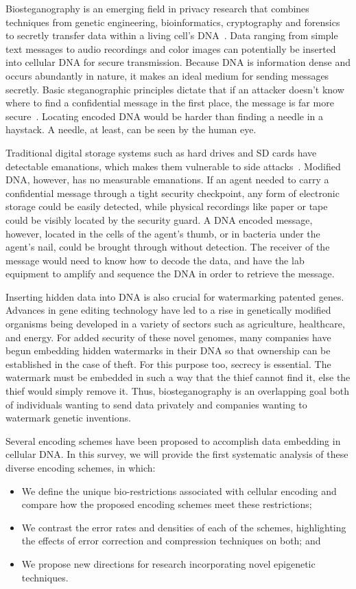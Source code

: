 \documentclass{bioinfo}
\begin{document}
Biosteganography is an emerging field in privacy research that combines techniques from genetic engineering, bioinformatics, cryptography and forensics to secretly transfer data within a living cell's DNA~\cite{B2016JOB}. Data ranging from simple text messages to audio recordings and color images can potentially be inserted into cellular DNA for secure transmission. Because DNA is information dense and occurs abundantly in nature, it makes an ideal medium for sending messages secretly. Basic steganographic principles dictate that if an attacker doesn't know where to find a confidential message in the first place, the message is far more secure~\cite{A2001IEEEIC}. Locating encoded DNA would be harder than finding a needle in a haystack. A needle, at least, can be seen by the human eye.

Traditional digital storage systems such as hard drives and SD cards have detectable emanations, which makes them vulnerable to side attacks~\cite{T2008TOIAS}. Modified DNA, however, has no measurable emanations. If an agent needed to carry a confidential message through a tight security checkpoint, any form of electronic storage could be easily detected, while physical recordings like paper or tape could be visibly located by the security guard. A DNA encoded message, however, located in the cells of the agent's thumb, or in bacteria under the agent's nail, could be brought through without detection. The receiver of the message would need to know how to decode the data, and have the lab equipment to amplify and sequence the DNA in order to retrieve the message.

Inserting hidden data into DNA is also crucial for watermarking patented genes. Advances in gene editing technology have led to a rise in genetically modified organisms being developed in a variety of sectors such as agriculture, healthcare, and energy. For added security of these novel genomes, many companies have begun embedding hidden watermarks in their DNA so that ownership can be established in the case of theft. For this purpose too, secrecy is essential. The watermark must be embedded in such a way that the thief cannot find it, else the thief would simply remove it. Thus, biosteganography is an overlapping goal both of individuals wanting to send data privately and companies wanting to watermark genetic inventions.

Several encoding schemes have been proposed to accomplish data embedding in cellular DNA. In this survey, we will provide the first systematic analysis of these diverse encoding schemes, in which:
\begin{itemize}
\item We define the unique bio-restrictions associated with cellular encoding and compare how the proposed encoding schemes meet these restrictions;
\item We contrast the error rates and densities of each of the schemes, highlighting the effects of error correction and compression techniques on both; and
\item We propose new directions for research incorporating novel epigenetic techniques.
\end{itemize}
\end{document}
